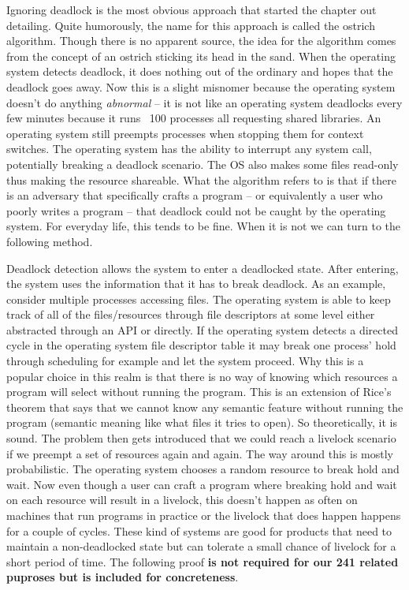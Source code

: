 Ignoring deadlock is the most obvious approach that started the chapter out detailing. Quite humorously, the name for this approach is called the \gls{ostrich algorithm}. Though there is no apparent source, the idea for the algorithm comes from the concept of an ostrich sticking its head in the sand. When the operating system detects deadlock, it does nothing out of the ordinary and hopes that the deadlock goes away. Now this is a slight misnomer because the operating system doesn't do anything \textit{abnormal} -- it is not like an operating system deadlocks every few minutes because it runs ~100 processes all requesting shared libraries. An operating system still preempts processes when stopping them for context switches. The operating system has the ability to interrupt any system call, potentially breaking a deadlock scenario. The OS also makes some files read-only thus making the resource shareable. What the algorithm refers to is that if there is an adversary that specifically crafts a program -- or equivalently a user who poorly writes a program -- that deadlock could not be caught by the operating system. For everyday life, this tends to be fine. When it is not we can turn to the following method.

Deadlock detection allows the system to enter a deadlocked state. After entering, the system uses the information that it has to break deadlock. As an example, consider multiple processes accessing files. The operating system is able to keep track of all of the files/resources through file descriptors at some level either abstracted through an API or directly. If the operating system detects a directed cycle in the operating system file descriptor table it may break one process' hold through scheduling for example and let the system proceed. Why this is a popular choice in this realm is that there is no way of knowing which resources a program will select without running the program. This is an extension of Rice's theorem \cite{rice} that says that we cannot know any semantic feature without running the program (semantic meaning like what files it tries to open). So theoretically, it is sound. The problem then gets introduced that we could reach a livelock scenario if we preempt a set of resources again and again. The way around this is mostly probabilistic. The operating system chooses a random resource to break hold and wait. Now even though a user can craft a program where breaking hold and wait on each resource will result in a livelock, this doesn't happen as often on machines that run programs in practice or the livelock that does happen happens for a couple of cycles. These kind of systems are good for products that need to maintain a non-deadlocked state but can tolerate a small chance of livelock for a short period of time. The following proof \textbf{is not required for our 241 related puproses but is included for concreteness}.

